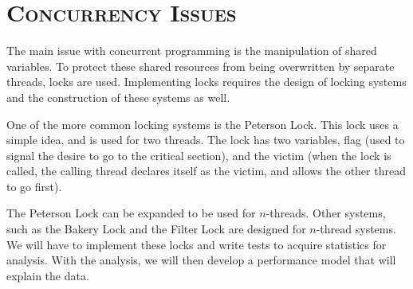 \documentclass[finalProject.tex]{subfiles}
\begin{document}
\bigskip

\section*{\textsc{\Large Concurrency Issues}}
	
	The main issue with concurrent programming is the manipulation of shared variables.  To protect these shared resources from being overwritten by separate threads, locks are used.  Implementing locks requires the design of locking systems and the construction of these systems as well.  
	
	One of the more common locking systems is the Peterson Lock.  This lock uses a simple idea, and is used for two threads.  The lock has two variables, flag (used to signal the desire to go to the critical section), and the victim (when the lock is called, the calling thread declares itself as the victim, and allows the other thread to go first).  
	
	The Peterson Lock can be expanded to be used for $n$-threads.  Other systems, such as the Bakery Lock and the Filter Lock are designed for $n$-thread systems.  We will have to implement these locks and write tests to acquire statistics for analysis.  With the analysis, we will then develop a performance model that will explain the data.
\end{document}
